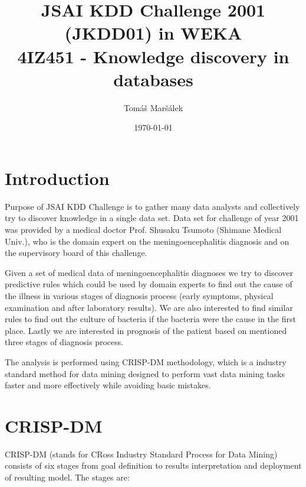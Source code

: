 \documentclass[11pt]{article}
\title{JSAI KDD Challenge 2001 (JKDD01) in WEKA \\ 4IZ451 - Knowledge discovery in databases}
\author{Tomáš Maršálek}
\date{\today}
\begin{document}
\maketitle
\thispagestyle{empty}
\clearpage

\section{Introduction}
Purpose of JSAI KDD Challenge is to gather many data analysts and collectively
try to discover knowledge in a single data set\cite{washio:jsai}. Data set for
challenge of year 2001 was provided by a medical doctor Prof. Shusaku Tsumoto
(Shimane Medical Univ.), who is the domain expert on the meningoencephalitis
diagnosis and on the supervisory board of this challenge.

Given a set of medical data of meningoencephalitis diagnoses we try to discover
predictive rules which could be used by domain experts to find out the cause of
the illness in various stages of diagnosis process (early symptoms, physical
examination and after laboratory results). We are also interested to find
similar rules to find out the culture of bacteria if the bacteria were the
cause in the first place. Lastly we are interested in prognosis of the patient
based on mentioned three stages of diagnosis process.

The analysis is performed using CRISP-DM methodology, which is a industry
standard method for data mining designed to perform vast data mining tasks
faster and more effectively while avoiding basic mistakes.


\section{CRISP-DM}
CRISP-DM (stands for CRoss Industry Standard Process for Data Mining) consists
of six stages from goal definition to results interpretation and deployment of
resulting model. The stages are:
\end{document}
